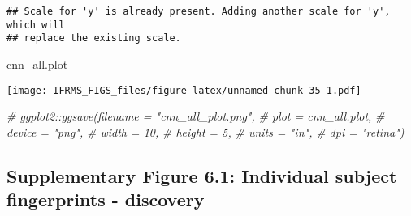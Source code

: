 \documentclass[
]{article}
\newenvironment{Shaded}{\begin{snugshade}}{\end{snugshade}}
\newcommand{\CommentTok}[1]{\textcolor[rgb]{0.56,0.35,0.01}{\textit{#1}}}
\newcommand{\NormalTok}[1]{#1}
\begin{document}
\begin{verbatim}
## Scale for 'y' is already present. Adding another scale for 'y', which will
## replace the existing scale.
\end{verbatim}

\begin{Shaded}
\begin{Highlighting}[]
\NormalTok{cnn_all.plot}
\end{Highlighting}
\end{Shaded}

\texttt{[image: IFRMS\_FIGS\_files/figure-latex/unnamed-chunk-35-1.pdf]}

\begin{Shaded}
\begin{Highlighting}[]
\CommentTok{# ggplot2::ggsave(filename = "cnn_all_plot.png",}
\CommentTok{#                 plot = cnn_all.plot,}
\CommentTok{#                 device = "png",}
\CommentTok{#                 width = 10,}
\CommentTok{#                 height = 5, }
\CommentTok{#                 units = "in",}
\CommentTok{#                 dpi = "retina")}
\end{Highlighting}
\end{Shaded}

\hypertarget{supplementary-figure-6.1-individual-subject-fingerprints---discovery}{%
\subsection{Supplementary Figure 6.1: Individual subject fingerprints -
discovery}\label{supplementary-figure-6.1-individual-subject-fingerprints---discovery}}
\end{document}
